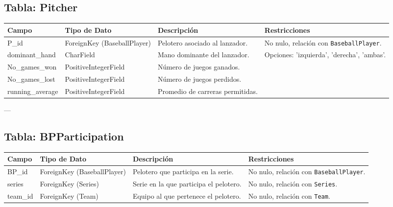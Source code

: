 \documentclass{report}
\begin{document}
    \subsection*{Tabla: Pitcher}
    \begin{tabular}{|>{\raggedright\arraybackslash}p{3cm}|>{\raggedright\arraybackslash}p{3cm}|>{\raggedright\arraybackslash}p{6cm}|>{\raggedright\arraybackslash}p{4cm}|}
        \hline
        \textbf{Campo} & \textbf{Tipo de Dato} & \textbf{Descripción} & \textbf{Restricciones} \\
        \hline
        P\_id & ForeignKey (BaseballPlayer) & Pelotero asociado al lanzador. & No nulo, relación con \texttt{BaseballPlayer}. \\
        \hline
        dominant\_hand & CharField & Mano dominante del lanzador. & Opciones: 'izquierda', 'derecha', 'ambas'. \\
        \hline
        No\_games\_won & PositiveIntegerField & Número de juegos ganados. &  \\
        \hline
        No\_games\_lost & PositiveIntegerField & Número de juegos perdidos. &  \\
        \hline
        running\_average & PositiveIntegerField & Promedio de carreras permitidas. &  \\
        \hline
    \end{tabular}
    
    ---
    
    \subsection*{Tabla: BPParticipation}
    \begin{tabular}{|>{\raggedright\arraybackslash}p{3cm}|>{\raggedright\arraybackslash}p{3cm}|>{\raggedright\arraybackslash}p{6cm}|>{\raggedright\arraybackslash}p{4cm}|}
        \hline
        \textbf{Campo} & \textbf{Tipo de Dato} & \textbf{Descripción} & \textbf{Restricciones} \\
        \hline
        BP\_id & ForeignKey (BaseballPlayer) & Pelotero que participa en la serie. & No nulo, relación con \texttt{BaseballPlayer}. \\
        \hline
        series & ForeignKey (Series) & Serie en la que participa el pelotero. & No nulo, relación con \texttt{Series}. \\
        \hline
        team\_id & ForeignKey (Team) & Equipo al que pertenece el pelotero. & No nulo, relación con \texttt{Team}. \\
        \hline
    \end{tabular}
    
\end{document}
